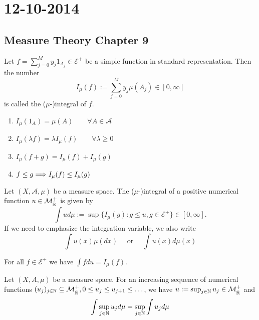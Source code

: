 \section{12-10-2014}
\subsection{Measure Theory Chapter 9}
\begin{defn}
Let \(f=\sum _{j=0}^M y_{j}1_{A_{j}}\in \mathcal{E}^+\) be a simple function in standard representation. Then the number
\[
I_\mu (f):=\sum _{j=0}^My_{j}\mu (A_{j})\in [0,\infty ]
\]
is called the (\(\mu \)-)integral of \(f\).
\end{defn}

\begin{thm}

\begin{enumerate}
  \item \(I_\mu (1_A)=\mu (A) \qquad \forall A\in \mathcal{A}\)
  \item \(I_\mu (\lambda f)=\lambda I_\mu (f) \qquad \forall \lambda \geq 0\)
  \item \(I_\mu (f+g)=I_\mu (f)+I_\mu (g)\)
  \item \(f\leq g\space \Longrightarrow \space I_\mu (f)\leq I_\mu (g)\)

\end{enumerate}
\end{thm}

\begin{defn}
Let \((X,\mathcal{A},\mu )\) be a measure space. The (\(\mu \)-)integral of a positive numerical function \(u\in \mathcal{M}^+_{\bar{\Bbb{R}}}\) is given by
\[
\int  u d\mu :=\sup\{I_\mu (g) : g\leq u, g\in \mathcal{E}^+\}\in [0,\infty ].
\]
If we need to emphasize the integration variable, we also write
\[
\int u(x)\mu (dx)\quad \text{ or }\quad \int u(x)d\mu (x)
\]
\end{defn}

\begin{thm}
For all \(f\in \mathcal{E}^+\) we have \(\int fdu=I_\mu (f).\)
\end{thm}

\begin{thm}
Let \((X,A,\mu )\) be a measure space. For an increasing sequence of numerical functions \((u_{j})_{j\in \Bbb{N}}\subseteq \mathcal{M}^+_{\bar{\Bbb{R}}}, 0\leq u_{j}\leq u_{j+1}\leq \ldots \), we have \(u:=\sup_{j\in \Bbb{N}}u_{j}\in \mathcal{M}_{\bar{\Bbb{R}}}^+\) and
\[
\int \sup_{j\in \Bbb{N}}u_{j}d\mu  = \sup_{j\in \Bbb{N}} \int u_{j} d\mu 
\]
\end{thm}


